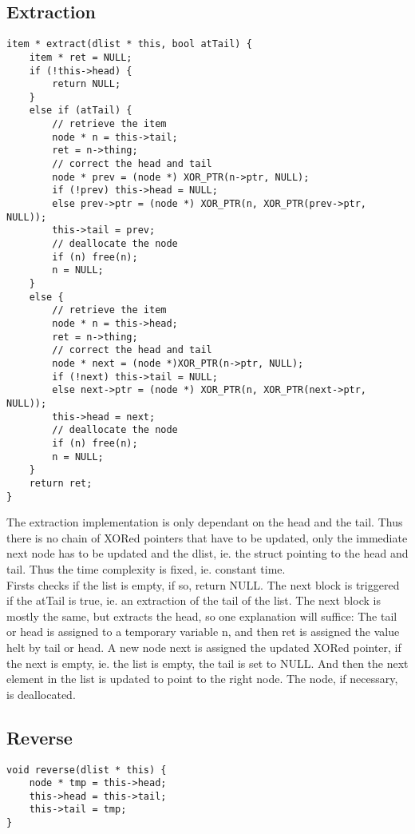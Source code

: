 \documentclass[11pt]{article}
\begin{document}
\subsection{Extraction}
\begin{lstlisting}
item * extract(dlist * this, bool atTail) {
    item * ret = NULL;
    if (!this->head) {
        return NULL;
    }
    else if (atTail) {
        // retrieve the item
        node * n = this->tail;
        ret = n->thing;
        // correct the head and tail
        node * prev = (node *) XOR_PTR(n->ptr, NULL);
        if (!prev) this->head = NULL;
        else prev->ptr = (node *) XOR_PTR(n, XOR_PTR(prev->ptr, NULL));
        this->tail = prev;
        // deallocate the node
        if (n) free(n);
        n = NULL;
    }
    else {
        // retrieve the item
        node * n = this->head;
        ret = n->thing;
        // correct the head and tail
        node * next = (node *)XOR_PTR(n->ptr, NULL);
        if (!next) this->tail = NULL;
        else next->ptr = (node *) XOR_PTR(n, XOR_PTR(next->ptr, NULL));
        this->head = next;
        // deallocate the node
        if (n) free(n);
        n = NULL;
    }
    return ret;
}
\end{lstlisting}
The extraction implementation is only dependant on the head and the tail. Thus
there is no chain of XORed pointers that have to be updated, only the immediate 
next node has to be updated and the dlist, ie. the struct pointing to the head
and tail. Thus the time complexity is fixed, ie. constant time.\\
Firsts checks if the list is empty, if so, return NULL. The next block is
triggered if the atTail is true, ie. an extraction of the tail of the list. The
next block is mostly the same, but extracts the head, so one explanation will
suffice:
The tail or head is assigned to a temporary variable n, and then ret is assigned
the value helt by tail or head. A new node next is assigned the updated XORed
pointer, if the next is empty, ie. the list is empty, the tail is set to NULL. 
And then the next element in the list is updated to point to the right node.
The node, if necessary, is deallocated.

\subsection{Reverse}
\begin{lstlisting}
void reverse(dlist * this) {
    node * tmp = this->head;
    this->head = this->tail;
    this->tail = tmp;
}
\end{lstlisting}
\end{document}
